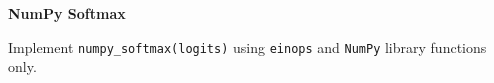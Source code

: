\item {} \textbf{NumPy Softmax}

Implement \texttt{numpy\_softmax(logits)} using \texttt{einops} and \texttt{NumPy} library functions only.
